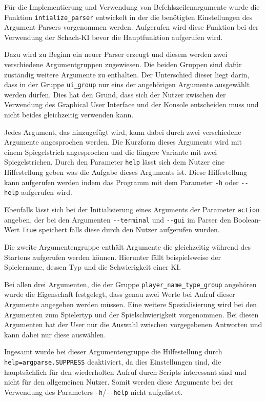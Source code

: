 Für die Implementierung und Verwendung von Befehlszeilenargumente wurde
die Funktion \texttt{intialize\_parser} entwickelt in der die benötigten
Einstellungen des Argument-Parsers vorgenommen werden. Aufgerufen wird
diese Funktion bei der Verwendung der Schach-KI bevor die Hauptfunktion
aufgerufen wird.

Dazu wird zu Beginn ein neuer Parser erzeugt und diesem werden zwei
verschiedene Argumentgruppen zugewiesen. Die beiden Gruppen sind dafür
zuständig weitere Argumente zu enthalten. Der Unterschied dieser liegt
darin, dass in der Gruppe \texttt{ui\_group} nur eins der angehörigen
Argumente ausgewählt werden dürfen. Dies hat den Grund, dass sich der
Nutzer zwischen der Verwendung des Graphical User Interface und der
Konsole entscheiden muss und nicht beides gleichzeitig verwenden kann.

Jedes Argument, das hinzugefügt wird, kann dabei durch zwei verschiedene
Argumente angesprochen werden. Die Kurzform dieses Arguments wird mit
einem Spiegelstrich angesprochen und die längere Variante mit zwei
Spiegelstrichen. Durch den Parameter \texttt{help} lässt sich dem Nutzer
eine Hilfestellung geben was die Aufgabe dieses Arguments ist. Diese
Hilfestellung kann aufgerufen werden indem das Programm mit dem
Parameter \texttt{-h} oder \texttt{-\/-help} aufgerufen wird.

Ebenfalls lässt sich bei der Initialisierung eines Arguments der
Parameter \texttt{action} angeben, der bei den Argumenten
\texttt{-\/-terminal} und \texttt{-\/-gui} im Parser den Boolean-Wert
\texttt{True} speichert falls diese durch den Nutzer aufgerufen wurden.

Die zweite Argumentengruppe enthält Argumente die gleichzeitig während
des Startens aufgerufen werden können. Hierunter fällt beispielsweise
der Spielername, dessen Typ und die Schwierigkeit einer KI.

Bei allen drei Argumenten, die der Gruppe
\texttt{player\_name\_type\_group} angehören wurde die Eigenschaft
festgelegt, dass genau zwei Werte bei Aufruf dieser Argumente angegeben
werden müssen. Eine weitere Spezialisierung wird bei den Argumenten zum
Spielertyp und der Spielschwierigkeit vorgenommen. Bei diesen Argumenten
hat der User nur die Auswahl zwischen vorgegebenen Antworten und kann
dabei nur diese auswählen.

Ingesamt wurde bei dieser Argumentengruppe die Hilfestellung durch
\texttt{help=argparse.SUPPRESS} deaktiviert, da dies Einstellungen sind,
die hauptsächlich für den wiederholten Aufruf durch Scripts interessant
sind und nicht für den allgemeinen Nutzer. Somit werden diese Argumente
bei der Verwendung des Parameters \texttt{-h}/\texttt{-\/-help} nicht
aufgelistet.


